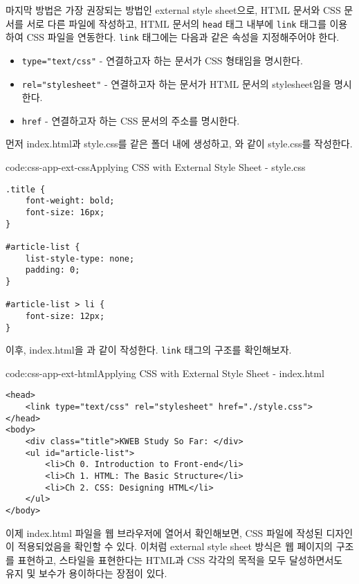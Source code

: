 마지막 방법은 가장 권장되는 방법인 external style sheet으로, HTML 문서와 CSS 문서를 서로 다른 파일에 작성하고, HTML 문서의 \texttt{head} 태그 내부에 \texttt{link} 태그를 이용하여 CSS 파일을 연동한다. \texttt{link} 태그에는 다음과 같은 속성을 지정해주어야 한다.

\begin{itemize}
    \item \texttt{type="text/css"} - 연결하고자 하는 문서가 CSS 형태임을 명시한다.
    \item \texttt{rel="stylesheet"} - 연결하고자 하는 문서가 HTML 문서의 stylesheet임을 명시한다.
    \item \texttt{href} - 연결하고자 하는 CSS 문서의 주소를 명시한다.
\end{itemize}

먼저 index.html과 style.css를 같은 폴더 내에 생성하고, 와 같이 style.css를 작성한다.

\begin{codeenv}{code:css-app-ext-css}{Applying CSS with External Style Sheet - style.css}\begin{verbatim}
.title {
    font-weight: bold;
    font-size: 16px;
}

#article-list {
    list-style-type: none;
    padding: 0;
}

#article-list > li {
    font-size: 12px;
}
\end{verbatim}
\end{codeenv}

이후, index.html을 과 같이 작성한다. \texttt{link} 태그의 구조를 확인해보자.

\begin{codeenv}{code:css-app-ext-html}{Applying CSS with External Style Sheet - index.html}\begin{verbatim}
<head>
    <link type="text/css" rel="stylesheet" href="./style.css">
</head>
<body>
    <div class="title">KWEB Study So Far: </div>
    <ul id="article-list">
        <li>Ch 0. Introduction to Front-end</li>
        <li>Ch 1. HTML: The Basic Structure</li>
        <li>Ch 2. CSS: Designing HTML</li>
    </ul>
</body>
\end{verbatim}
\end{codeenv}

이제 index.html 파일을 웹 브라우저에 열어서 확인해보면, CSS 파일에 작성된 디자인이 적용되었음을 확인할 수 있다. 이처럼 external style sheet 방식은 웹 페이지의 구조를 표현하고, 스타일을 표현한다는 HTML과 CSS 각각의 목적을 모두 달성하면서도 유지 및 보수가 용이하다는 장점이 있다. 
